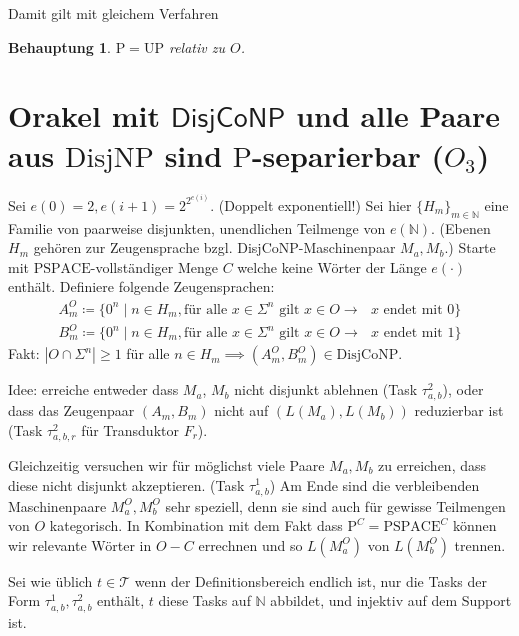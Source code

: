 \documentclass[nofonts]{uebung}
\newtheorem{claim}[theorem]{Behauptung}
\theoremstyle{definition}
\def\P{\ensuremath{\mathrm{P}}}
\def\UP{\ensuremath{\mathrm{UP}}}
\def\DisjNP{\ensuremath{\mathrm{DisjNP}}}
\def\DisjCoNP{\ensuremath{\mathrm{DisjCoNP}}}
\def\hDisjCoNP{\ensuremath{\mathsf{DisjCoNP}}}
\begin{document}
Damit gilt mit gleichem Verfahren

\begin{claim}
    $\P=\UP$ relativ zu $O$.
\end{claim}

\clearpage
\section{Orakel mit $\hDisjCoNP$ und alle Paare aus $\DisjNP$ sind $\P$-separierbar ($O_3$)}

Sei $e(0)=2, e(i+1)=2^{2^{e(i)}}$. (Doppelt exponentiell!) Sei hier $\{H_m\}_{m\in\mathbb N}$ eine Familie von paarweise disjunkten, unendlichen Teilmenge von $e(\mathbb N)$. (Ebenen $H_m$ gehören zur Zeugensprache bzgl. DisjCoNP-Maschinenpaar $M_a, M_b$.)
Starte mit $\mathrm{PSPACE}$-vollständiger Menge $C$ welche keine Wörter der Länge $e(\cdot)$ enthält.
Definiere folgende Zeugensprachen:
\begin{gather*}
    A_m^O \coloneqq \{ 0^n \mid n\in H_m, \text{für alle $x\in \Sigma^{n}$ gilt } x\in O \rightarrow \text{ $x$ endet mit $0$} \}\\
    B_m^O \coloneqq \{ 0^n \mid n\in H_m, \text{für alle $x\in \Sigma^{n}$ gilt } x\in O \rightarrow \text{ $x$ endet mit $1$} \}
\end{gather*}
Fakt: $|O\cap \Sigma^n|\geq 1$ für alle $n\in H_m \implies (A_m^O, B_m^O)\in\DisjCoNP$.
\medskip

Idee: erreiche entweder dass $M_a$, $M_b$ nicht disjunkt ablehnen (Task $\tau^2_{a,b}$), oder dass das Zeugenpaar $(A_m,B_m)$ nicht auf $(L(M_a),L(M_b))$ reduzierbar ist (Task $\tau^2_{a,b,r}$ für Transduktor $F_r$).

Gleichzeitig versuchen wir für möglichst viele Paare $M_a, M_b$ zu erreichen, dass diese nicht disjunkt akzeptieren. (Task $\tau^1_{a,b}$)
Am Ende sind die verbleibenden Maschinenpaare $M_a^O, M_b^O$ sehr speziell, denn sie sind auch für gewisse Teilmengen von $O$ kategorisch.
In Kombination mit dem Fakt dass $\P^C=\mathrm{PSPACE}^C$ können wir relevante Wörter in $O-C$ errechnen und so $L(M_a^O)$ von $L(M_b^O)$ trennen.
\medskip

Sei wie üblich $t\in \mathcal T$ wenn der Definitionsbereich endlich ist, nur die Tasks der Form $\tau^1_{a,b}, \tau^2_{a,b}$ enthält, $t$ diese Tasks auf $\mathbb N$ abbildet, und injektiv auf dem Support ist.
\end{document}
